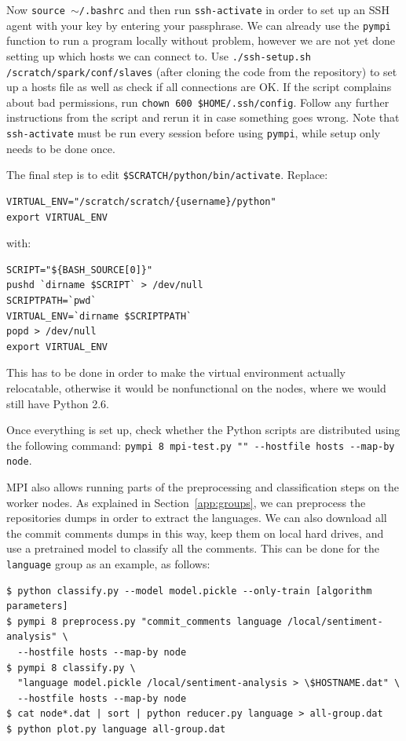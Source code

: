 \documentclass{article}
\begin{document}
Now \texttt{source $\sim$/.bashrc} and then run \texttt{ssh-activate} in order 
to set up an SSH agent with your key by entering your passphrase. We can 
already use the \texttt{pympi} function to run a program locally without 
problem, however we are not yet done setting up which hosts we can connect to. 
Use \texttt{./ssh-setup.sh /scratch/spark/conf/slaves} (after cloning the code 
from the repository) to set up a hosts file as well as check if all connections 
are OK\@. If the script complains about bad permissions, run \texttt{chown 600 
\$HOME/.ssh/config}. Follow any further instructions from the script and rerun 
it in case something goes wrong. Note that \texttt{ssh-activate} must be run 
every session before using \texttt{pympi}, while setup only needs to be done 
once.

The final step is to edit \texttt{\$SCRATCH/python/bin/activate}. Replace:

\begin{verbatim}
VIRTUAL_ENV="/scratch/scratch/{username}/python"
export VIRTUAL_ENV
\end{verbatim}

with:

\begin{verbatim}
SCRIPT="${BASH_SOURCE[0]}"
pushd `dirname $SCRIPT` > /dev/null
SCRIPTPATH=`pwd`
VIRTUAL_ENV=`dirname $SCRIPTPATH`
popd > /dev/null
export VIRTUAL_ENV
\end{verbatim}

This has to be done in order to make the virtual environment actually 
relocatable, otherwise it would be nonfunctional on the nodes, where we would 
still have Python 2.6.

Once everything is set up, check whether the Python scripts are distributed 
using the following command: \texttt{pympi 8 mpi-test.py "" -{}-hostfile 
hosts -{}-map-by node}.

MPI also allows running parts of the preprocessing and classification steps on 
the worker nodes. As explained in Section~\ref{app:groups}, we can preprocess 
the repositories dumps in order to extract the languages. We can also download 
all the commit comments dumps in this way, keep them on local hard drives, and 
use a pretrained model to classify all the comments. This can be done for the 
\texttt{language} group as an example, as follows:

\begin{verbatim}
$ python classify.py --model model.pickle --only-train [algorithm parameters]
$ pympi 8 preprocess.py "commit_comments language /local/sentiment-analysis" \
  --hostfile hosts --map-by node
$ pympi 8 classify.py \
  "language model.pickle /local/sentiment-analysis > \$HOSTNAME.dat" \
  --hostfile hosts --map-by node
$ cat node*.dat | sort | python reducer.py language > all-group.dat
$ python plot.py language all-group.dat
\end{verbatim}
\end{document}
